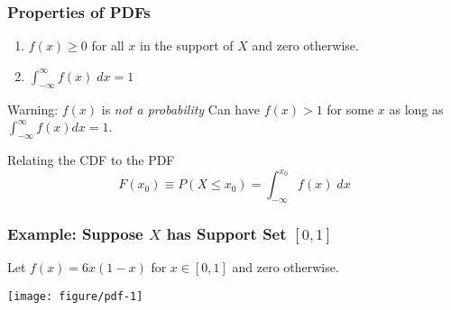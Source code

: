 \begin{frame}
  \frametitle{Properties of PDFs}

\begin{enumerate}
  \item $f(x)\geq 0$ for all $x$ in the support of $X$ and zero otherwise.
\item $\int_{-\infty}^\infty f(x) \; dx = 1$ 
\end{enumerate}

\pause

\vspace{1em}

\begin{alertblock}{Warning: $f(x)$ is \emph{not a probability}}
  Can have $f(x)>1$ for some $x$ as long as $\int_{-\infty}^\infty f(x) dx =1$.
\end{alertblock}

\pause

\vspace{1em}

\begin{block}{Relating the CDF to the PDF}
  \vspace{-1em}
  \[
  F(x_0) \equiv P(X\leq x_0) = \int_{-\infty}^{x_0} f(x) \; dx 
\]
\end{block}

\end{frame}
\begin{frame}[fragile]
  \frametitle{Example: Suppose $X$ has Support Set $[0,1]$}

  Let $f(x) = 6x(1-x)$ for $x \in [0,1]$ and zero otherwise.

  \footnotesize
\begin{knitrout}
\color{fgcolor}\begin{kframe}
\begin{alltt}
\hlstd{(} \hlopt{*}  \hlopt{*} \hlstd{(} \hlopt{-}   \hlstd{=} \hlstd{,}  \hlstd{=} \hlstd{,}  \hlstd{=} \hlstd{)}
\hlstd{(} \hlstd{=} \hlstd{,}  \hlstd{=} \hlstd{)}
\end{alltt}
\end{kframe}
\texttt{[image: figure/pdf-1]} 

\end{knitrout}


\end{frame}
